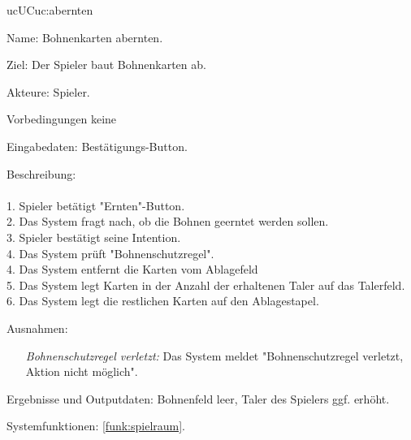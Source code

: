 \begin{description}[leftmargin=5em, style=sameline]
	\begin{lhp}{uc}{UC}{uc:abernten}
		\item [Name:] Bohnenkarten abernten.
		\item [Ziel:] Der Spieler baut Bohnenkarten ab.
		\item [Akteure:] Spieler.
		\item [Vorbedingungen] keine
		\item [Eingabedaten:] Bestätigungs-Button.
		\item [Beschreibung:] \hfill\\ \hfill\\
			1. Spieler betätigt "{}Ernten{}"{}-Button.\\
			2. Das System fragt nach, ob die Bohnen geerntet werden sollen.\\
			3. Spieler bestätigt seine Intention.\\
			4. Das System prüft "{}Bohnenschutzregel{}"{}.\\
			4. Das System entfernt die Karten vom Ablagefeld\\
			5. Das System legt Karten in der Anzahl der erhaltenen Taler auf das Talerfeld.\\	
			6. Das System legt die restlichen Karten auf den Ablagestapel.\\
		\item [Ausnahmen:] \hfill
			\begin{itemize} 
				\item[] \textit{Bohnenschutzregel verletzt:} Das System meldet {}"Bohnenschutzregel verletzt, Aktion nicht möglich{}"{}.
				
			\end{itemize}
		\item [Ergebnisse und Outputdaten:] Bohnenfeld leer, Taler des Spielers ggf. erhöht.	
		\item [Systemfunktionen:] \ref{funk:spielraum}.
	\end{lhp}


\end{description}
